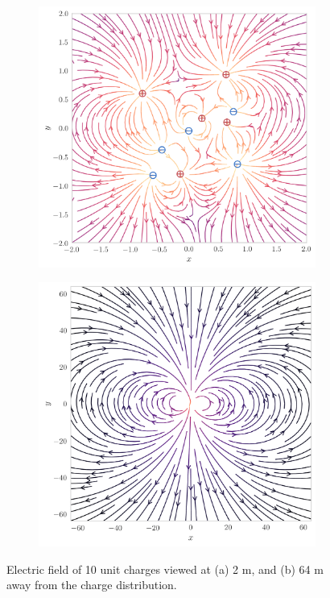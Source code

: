 \documentclass[12pt,a4paper,twoside]{article}
\begin{document}
\begin{figure}[tb]
    \centering
	\begin{subfigure}[h!]{0.45\textwidth}
		\centering
		\includegraphics[width=\textwidth]{117-2.png}
		\caption{}
		\label{fig:field-2m}
	\end{subfigure}
	\begin{subfigure}[h!]{0.45\textwidth}
		\centering
		\includegraphics[width=\textwidth]{117-64.png}
		\caption{}
		\label{fig:field-64m}
	\end{subfigure}
	\caption{Electric field of 10 unit charges viewed at (a) 2 m, and (b) 64 m away from the charge distribution.}
	\label{fig:field}
\end{figure}
\end{document}
